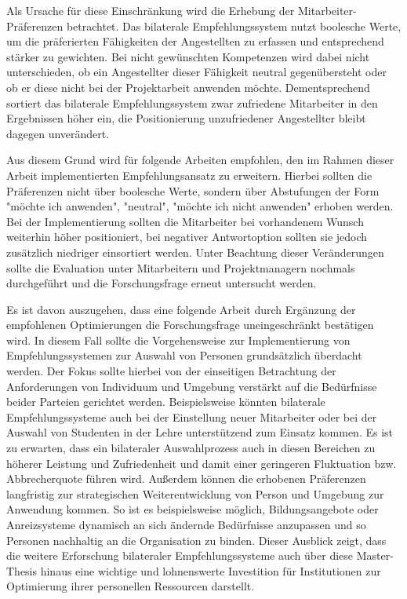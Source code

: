 Als Ursache für diese Einschränkung wird die Erhebung der Mitarbeiter-Präferenzen betrachtet. Das bilaterale Empfehlungssystem nutzt boolesche Werte, um die präferierten Fähigkeiten der Angestellten zu erfassen und entsprechend stärker zu gewichten. Bei nicht gewünschten Kompetenzen wird dabei nicht unterschieden, ob ein Angestellter dieser Fähigkeit neutral gegenübersteht oder ob er diese nicht bei der Projektarbeit anwenden möchte. Dementsprechend sortiert das bilaterale Empfehlungssystem zwar zufriedene Mitarbeiter in den Ergebnissen höher ein, die Positionierung unzufriedener Angestellter bleibt dagegen unverändert.

Aus diesem Grund wird für folgende Arbeiten empfohlen, den im Rahmen dieser Arbeit implementierten Empfehlungsansatz zu erweitern. Hierbei sollten die Präferenzen nicht über boolesche Werte, sondern über Abstufungen der Form "möchte ich anwenden", "neutral", "möchte ich nicht anwenden" erhoben werden. Bei der Implementierung sollten die Mitarbeiter bei vorhandenem Wunsch weiterhin höher positioniert, bei negativer Antwortoption sollten sie jedoch zusätzlich niedriger einsortiert werden. Unter Beachtung dieser Veränderungen sollte die Evaluation unter Mitarbeitern und Projektmanagern nochmals durchgeführt und die Forschungsfrage erneut untersucht werden.

Es ist davon auszugehen, dass eine folgende Arbeit durch Ergänzung der empfohlenen Optimierungen die Forschungsfrage uneingeschränkt bestätigen wird. In diesem Fall sollte die Vorgehensweise zur Implementierung von Empfehlungssystemen zur Auswahl von Personen grundsätzlich überdacht werden. Der Fokus sollte hierbei von der einseitigen Betrachtung der Anforderungen von Individuum und Umgebung verstärkt auf die Bedürfnisse beider Parteien gerichtet werden. Beispielsweise könnten bilaterale Empfehlungssysteme auch bei der Einstellung neuer Mitarbeiter oder bei der Auswahl von Studenten in der Lehre unterstützend zum Einsatz kommen. Es ist zu erwarten, dass ein bilateraler Auswahlprozess auch in diesen Bereichen zu höherer Leistung und Zufriedenheit und damit einer geringeren Fluktuation bzw. Abbrecherquote führen wird. Außerdem können die erhobenen Präferenzen langfristig zur strategischen Weiterentwicklung von Person und Umgebung zur Anwendung kommen. So ist es beispielsweise möglich, Bildungsangebote oder Anreizsysteme dynamisch an sich ändernde Bedürfnisse anzupassen und so Personen nachhaltig an die Organisation zu binden. Dieser Ausblick zeigt, dass die weitere Erforschung bilateraler Empfehlungssysteme auch über diese Master-Thesis hinaus eine wichtige und lohnenswerte Investition für Institutionen zur Optimierung ihrer personellen Ressourcen darstellt.
